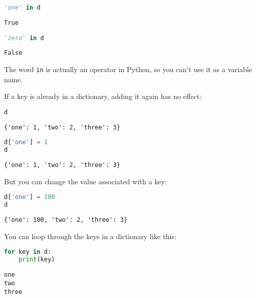 \begin{lstlisting}[language=Python]
'one' in d
\end{lstlisting}

\begin{lstlisting}[]
True
\end{lstlisting}

\begin{lstlisting}[language=Python]
'zero' in d
\end{lstlisting}

\begin{lstlisting}[]
False
\end{lstlisting}

The word \passthrough{\lstinline!in!} is actually an operator in Python,
so you can't use it as a variable name.

If a key is already in a dictionary, adding it again has no effect:

\begin{lstlisting}[language=Python]
d
\end{lstlisting}

\begin{lstlisting}[]
{'one': 1, 'two': 2, 'three': 3}
\end{lstlisting}

\begin{lstlisting}[language=Python]
d['one'] = 1
d
\end{lstlisting}

\begin{lstlisting}[]
{'one': 1, 'two': 2, 'three': 3}
\end{lstlisting}

But you can change the value associated with a key:

\begin{lstlisting}[language=Python]
d['one'] = 100
d
\end{lstlisting}

\begin{lstlisting}[]
{'one': 100, 'two': 2, 'three': 3}
\end{lstlisting}

You can loop through the keys in a dictionary like this:

\begin{lstlisting}[language=Python]
for key in d:
    print(key)
\end{lstlisting}

\begin{lstlisting}[]
one
two
three
\end{lstlisting}

